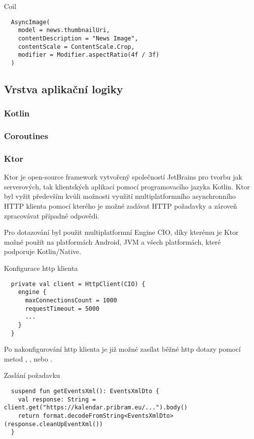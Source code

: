 
\begin{listing}[H]
\caption{Coil}\label{lst:Coil3}
\begin{verbatim}
  AsyncImage(
    model = news.thumbnailUri,
    contentDescription = "News Image",
    contentScale = ContentScale.Crop,
    modifier = Modifier.aspectRatio(4f / 3f)
  )
\end{verbatim}
\end{listing}

\subsection{Vrstva aplikační logiky}

\subsubsection*{Kotlin}
\subsubsection*{Coroutines}
\subsubsection*{Ktor}
Ktor je open-source framework vytvořený společností JetBrains pro tvorbu jak serverových, tak klientských aplikací pomocí programovacího 
jazyka Kotlin. Ktor byl vyžit především kvůli možnosti využití multiplatformního asynchronního HTTP klienta pomocí kterého je možné zadávat 
HTTP požadavky a zároveň zpracovávat případné odpovědi. 

Pro dotazování byl použit multiplatformní Engine CIO, díky kterému je Ktor možné použít na platformách Android, JVM a všech platformách, které podporuje Kotlin/Native.
\begin{listing}[H]
\caption{Konfigurace http klienta}\label{lst:ktorConfig}
\begin{verbatim}
  private val client = HttpClient(CIO) {
    engine {
      maxConnectionsCount = 1000
      requestTimeout = 5000
      ...
    }
  }
\end{verbatim}
\end{listing}

Po nakonfigurování http klienta je již možné zasílat běžné http dotazy pomocí metod , ,  nebo .
\begin{listing}[H]
\caption{Zaslání požadavku}\label{lst:ktorRequest}
\begin{verbatim}
  suspend fun getEventsXml(): EventsXmlDto {
    val response: String = client.get("https://kalendar.pribram.eu/...").body()
    return format.decodeFromString<EventsXmlDto>(response.cleanUpEventXml())
  }
\end{verbatim}
\end{listing}

